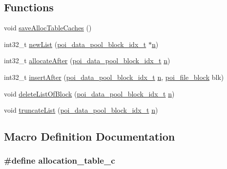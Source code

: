 \subsection*{Functions}
\begin{DoxyCompactItemize}
\item 
void \hyperlink{allocation-table_8c_a20af25d3b441d1f25e4830ee2173480c}{save\-Alloc\-Table\-Caches} ()
\item 
int32\-\_\-t \hyperlink{allocation-table_8c_ada2e09277dd8e97a2b2b75484b738126}{new\-List} (\hyperlink{data-pool-block-manager_8h_a87e19ab8290bcd76be1c7db1e90cc6f6}{poi\-\_\-data\-\_\-pool\-\_\-block\-\_\-idx\-\_\-t} $\ast$\hyperlink{allocation-table-test_8c_a24010dade8ebab3f87a48022772cd975}{n})
\item 
int32\-\_\-t \hyperlink{allocation-table_8c_a89ea9558bd50decb1bbbf85e569fe6c5}{allocate\-After} (\hyperlink{data-pool-block-manager_8h_a87e19ab8290bcd76be1c7db1e90cc6f6}{poi\-\_\-data\-\_\-pool\-\_\-block\-\_\-idx\-\_\-t} \hyperlink{allocation-table-test_8c_a24010dade8ebab3f87a48022772cd975}{n})
\item 
int32\-\_\-t \hyperlink{allocation-table_8c_a6de48f9bdf37e8005b9973a75d07633a}{insert\-After} (\hyperlink{data-pool-block-manager_8h_a87e19ab8290bcd76be1c7db1e90cc6f6}{poi\-\_\-data\-\_\-pool\-\_\-block\-\_\-idx\-\_\-t} \hyperlink{allocation-table-test_8c_a24010dade8ebab3f87a48022772cd975}{n}, \hyperlink{structpoi__file__block}{poi\-\_\-file\-\_\-block} blk)
\item 
void \hyperlink{allocation-table_8c_a8d703df55ad80bb8fb1177a0542065b6}{delete\-List\-Of\-Block} (\hyperlink{data-pool-block-manager_8h_a87e19ab8290bcd76be1c7db1e90cc6f6}{poi\-\_\-data\-\_\-pool\-\_\-block\-\_\-idx\-\_\-t} \hyperlink{allocation-table-test_8c_a24010dade8ebab3f87a48022772cd975}{n})
\item 
void \hyperlink{allocation-table_8c_a986965542b07562f2f205f9d68043a9c}{truncate\-List} (\hyperlink{data-pool-block-manager_8h_a87e19ab8290bcd76be1c7db1e90cc6f6}{poi\-\_\-data\-\_\-pool\-\_\-block\-\_\-idx\-\_\-t} \hyperlink{allocation-table-test_8c_a24010dade8ebab3f87a48022772cd975}{n})
\end{DoxyCompactItemize}


\subsection{Macro Definition Documentation}
\hypertarget{allocation-table_8c_afc5318de31f175f755f75812b44051c6}{
\subsubsection[{allocation\-\_\-table\-\_\-c}]{\setlength{\rightskip}{0pt plus 5cm}\#define allocation\-\_\-table\-\_\-c}}\label{allocation-table_8c_afc5318de31f175f755f75812b44051c6}


